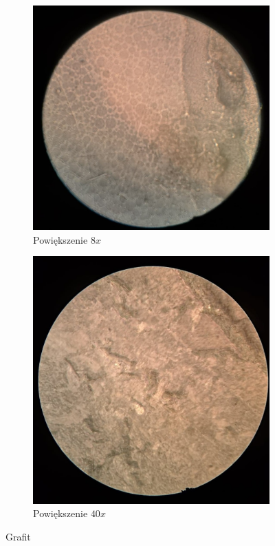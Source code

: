 \begin{figure}[H]
    \begin{subfigure}{.5\textwidth}
      \centering
      \includegraphics[width=.8\linewidth]{img/grafit8.jpg}  
      \caption{Powiększenie $8x$}
    \end{subfigure}
    \begin{subfigure}{.5\textwidth}
      \centering
      \includegraphics[width=.8\linewidth]{img/grafit40.jpg}  
      \caption{Powiększenie $40x$}
    \end{subfigure}
    \caption{Grafit}
\end{figure}

